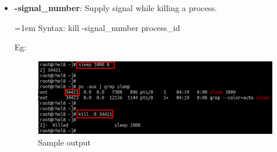 \begin{flushleft}
\begin{itemize}
\begin{itemize}
			\item \textbf{-signal\_number}: Supply signal while killing a process.
			\begin{tcolorbox}[breakable,notitle,boxrule=-0pt,colback=pink,colframe=pink]
				\color{black}
				\font=1em
				Syntax: kill -signal\_number process\_id
				\font=4pt
			\end{tcolorbox}		
			Eg:
			\begin{figure}[h!]
				\centering
				\includegraphics[scale=.25]{content/chapter12/images/kill3.png}
				\caption{Sample output}
				\label{fig:process23456}
			\end{figure}
		

\end{itemize}
\end{itemize}
\end{flushleft}
